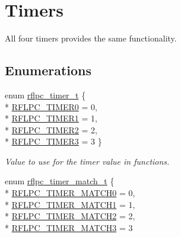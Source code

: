 \hypertarget{group__timer}{\section{Timers}
\label{group__timer}
}


All four timers provides the same functionality.  


\subsection*{Enumerations}
\begin{DoxyCompactItemize}
\item 
enum \hyperlink{group__timer_gac08825cb88d61086e74638b859cb8b34}{rflpc\-\_\-timer\-\_\-t} \{ \\*
\hyperlink{group__timer_ggac08825cb88d61086e74638b859cb8b34a3940eddd10c5fda56bd7135695a668fb}{R\-F\-L\-P\-C\-\_\-\-T\-I\-M\-E\-R0} =  0, 
\\*
\hyperlink{group__timer_ggac08825cb88d61086e74638b859cb8b34a192b4b89b2cc0e52eb5a02b0604f3a06}{R\-F\-L\-P\-C\-\_\-\-T\-I\-M\-E\-R1} =  1, 
\\*
\hyperlink{group__timer_ggac08825cb88d61086e74638b859cb8b34ab568d24f928930ee72130757063ced2f}{R\-F\-L\-P\-C\-\_\-\-T\-I\-M\-E\-R2} =  2, 
\\*
\hyperlink{group__timer_ggac08825cb88d61086e74638b859cb8b34ac6c7308fa1e2c59e6db065ec8feea0e2}{R\-F\-L\-P\-C\-\_\-\-T\-I\-M\-E\-R3} =  3
 \}
\begin{DoxyCompactList}\small\item\em Value to use for the timer value in functions. \end{DoxyCompactList}\item 
enum \hyperlink{group__timer_ga6be569cd5e74a2e35678ee2de31e853a}{rflpc\-\_\-timer\-\_\-match\-\_\-t} \{ \\*
\hyperlink{group__timer_gga6be569cd5e74a2e35678ee2de31e853aaa4bdd0c929cb583837f258510f5e15fa}{R\-F\-L\-P\-C\-\_\-\-T\-I\-M\-E\-R\-\_\-\-M\-A\-T\-C\-H0} =  0, 
\\*
\hyperlink{group__timer_gga6be569cd5e74a2e35678ee2de31e853aaab7e73a250d7f795c42ff3bb71034ea5}{R\-F\-L\-P\-C\-\_\-\-T\-I\-M\-E\-R\-\_\-\-M\-A\-T\-C\-H1} =  1, 
\\*
\hyperlink{group__timer_gga6be569cd5e74a2e35678ee2de31e853aaa462318df3ce136257723a8981683de2}{R\-F\-L\-P\-C\-\_\-\-T\-I\-M\-E\-R\-\_\-\-M\-A\-T\-C\-H2} =  2, 
\\*
\hyperlink{group__timer_gga6be569cd5e74a2e35678ee2de31e853aa06295ccf9c85b81b2344e5c4abf75008}{R\-F\-L\-P\-C\-\_\-\-T\-I\-M\-E\-R\-\_\-\-M\-A\-T\-C\-H3} =  3

\end{DoxyCompactItemize}
